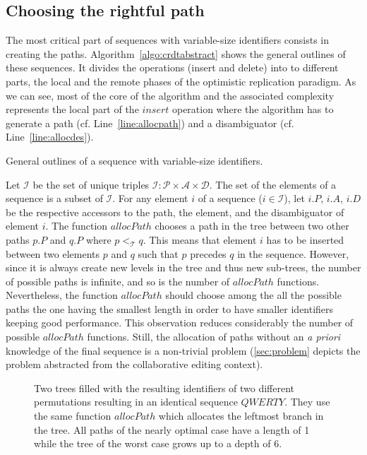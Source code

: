 \subsection{Choosing the rightful path}
\label{sec:choosing}

The most critical part of sequences with variable-size identifiers consists in
creating the paths. Algorithm~\ref{algo:crdtabstract} shows the general
outlines of these sequences. It divides the operations (insert and delete) into
to different parts, the local and the remote phases of the optimistic
replication paradigm. As we can see, most of the core of the algorithm and the
associated complexity represents the local part of the $insert$ operation where
the algorithm has to generate a path (cf. Line~\ref{line:allocpath}) and a
disambiguator (cf. Line~\ref{line:allocdes}).

\begin{algorithm}
  
  \caption{\label{algo:crdtabstract}General outlines of a sequence with
    variable-size identifiers.}
\end{algorithm}

Let $\mathcal{I}$ be the set of unique triples
$\mathcal{I}: \mathcal{P}\times\mathcal{A}\times\mathcal{D}$. The set of the
elements of a sequence is a subset of $\mathcal{I}$. For any element $i$ of a
sequence ($i \in \mathcal{I}$), let $i.P$, $i.A$, $i.D$ be the respective
accessors to the path, the element, and the disambiguator of element $i$. The
function $allocPath$ chooses a path in the tree between two other paths $p.P$
and $q.P$ where $p<_{\mathcal{T}}q$. This means that element $i$ has to be
inserted between two elements $p$ and $q$ such that $p$ precedes $q$ in the
sequence. However, since it is always create new levels in the tree and thus
new sub-trees, the number of possible paths is infinite, and so is the number
of $allocPath$ functions. Nevertheless, the function $allocPath$ should choose
among the all the possible paths the one having the smallest length in order to
have smaller identifiers keeping good performance. This observation reduces
considerably the number of possible $allocPath$ functions. Still, the
allocation of paths without an \emph{a priori} knowledge of the final sequence
is a non-trivial problem (\ref{sec:problem} depicts the problem abstracted from
the collaborative editing context).

\begin{figure}
  \centering
  
  \caption{\label{fig:allocpathexample} Two trees filled with the resulting
    identifiers of two different permutations resulting in an identical
    sequence $QWERTY$. They use the same function $allocPath$ which allocates
    the leftmost branch in the tree. All paths of the nearly optimal case have
    a length of 1 while the tree of the worst case grows up to a depth of 6.}
\end{figure}

